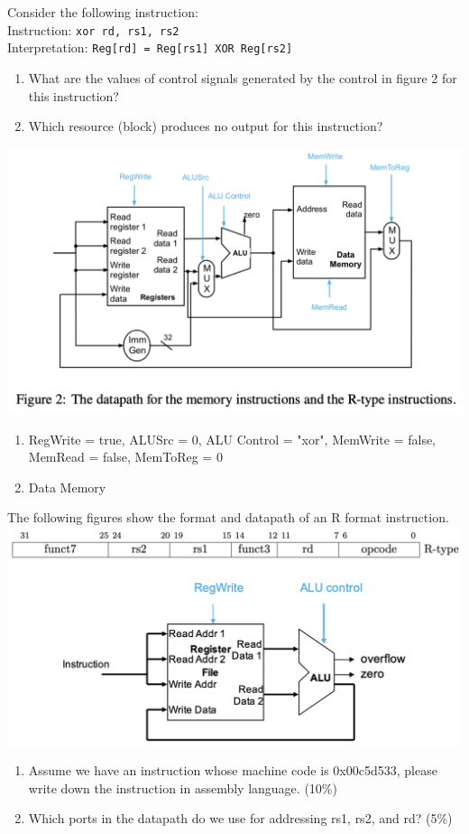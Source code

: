 \documentclass[12pt, a4paper]{article}
\begin{document}
\begin{q}{10}
Consider the following instruction:\\
Instruction: \texttt{xor rd, rs1, rs2}\\
Interpretation: \texttt{Reg[rd] = Reg[rs1] XOR Reg[rs2]}
\begin{enumerate}
    \item What are the values of control signals generated by the control in figure 2 for this
    instruction?
    \item Which resource (block) produces no output for this instruction?
\end{enumerate}
\begin{center}
    \includegraphics[scale=0.65]{q3.png}
\end{center}
\end{q}
\begin{ans}
    \begin{enumerate}
        \item RegWrite = true, ALUSrc = 0, ALU Control = "xor", MemWrite = false, \\MemRead = false, MemToReg = 0 
        \item Data Memory
    \end{enumerate}
\end{ans}
\pagebreak
\begin{q}{15}
The following figures show the format and datapath of an R format instruction.
\centering\includegraphics[scale=0.65]{q5.png}
\begin{enumerate}
    \item Assume we have an instruction whose machine code is 0x00c5d533, please write
    down the instruction in assembly language. (10\%)
    \item Which ports in the datapath do we use for addressing rs1, rs2, and rd? (5\%)
\end{enumerate}
\end{q}
\end{document}
